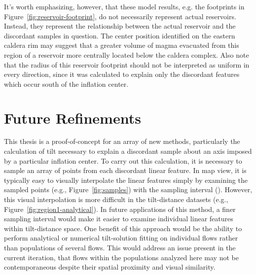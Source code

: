 It's worth emphasizing, however, that these model results, e.g. the footprints in Figure~\ref{fig:reservoir-footprint}, do not necessarily represent actual reservoirs. Instead, they represent the relationship between the actual reservoir and the discordant samples in question. The center position identified on the eastern caldera rim may suggest that a greater volume of magma evacuated from this region of a reservoir more centrally located below the caldera complex. Also note that the radius of this reservoir footprint should not be interpreted as uniform in every direction, since it was calculated to explain only the discordant features which occur south of the inflation center.

\section{Future Refinements}

This thesis is a proof-of-concept for an array of new methods, particularly the calculation of tilt necessary to explain a discordant sample about an axis imposed by a particular inflation center. To carry out this calculation, it is necessary to sample an array of points from each discordant linear feature. In map view, it is typically easy to visually interpolate the linear features simply by examining the sampled points (e.g., Figure~\ref{fig:samples}) with the sampling interval (\samplinginterval). However, this visual interpolation is more difficult in the tilt-distance datasets (e.g., Figure~\ref{fig:region1-analytical}). In future applications of this method, a finer sampling interval would make it easier to examine individual linear features within tilt-distance space. One benefit of this approach would be the ability to perform analytical or numerical tilt-solution fitting on individual flows rather than populations of several flows. This would address an issue present in the current iteration, that flows within the populations analyzed here may not be contemporaneous despite their spatial proximity and visual similarity.

